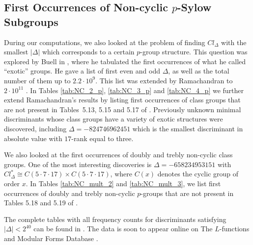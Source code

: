 \documentclass{mcom-l}
\theoremstyle{definition}
\begin{document}
\subsection{First Occurrences of Non-cyclic $p$-Sylow Subgroups}
During our computations, we also looked at the problem of finding
$Cl_\Delta$ with the smallest $|\Delta|$ which corresponds to a
certain $p$-group structure. This question was explored by Buell in
\cite{buell}, where he tabulated the first occurrences of what he
called ``exotic'' groups. He gave a list of first even and odd
$\Delta$, as well as the total number of them up to $2.2\cdot
10^9$. This list was extended by Ramachandran to $2\cdot 10^{11}$
\cite{ramachandran}. In Tables \ref{tab:NC_2_p}, \ref{tab:NC_3_p} and
\ref{tab:NC_4_p} we further extend Ramachandran's results by listing
first occurrences of class groups that are not present in Tables~5.13,
5.15 and 5.17 of \cite{ramachandran}.  Previously unknown minimal
discriminants whose class groups have a variety of exotic structures
were discovered, including $\Delta = -824746962451$ which is the
smallest discriminant in absolute value with $17$-rank equal to three.

We also looked at the first occurrences of doubly and trebly
non-cyclic class groups. One of the most interesting discoveries is
$\Delta = -658234953151$ with $Cl_\Delta^* \cong C(5\cdot 7\cdot 17)
\times C(5 \cdot 7 \cdot 17)$, where $C(x)$ denotes the cyclic group
of order $x$. In Tables \ref{tab:NC_mult_2} and \ref{tab:NC_mult_3},
we list first occurrences of doubly and trebly non-cyclic $p$-groups
that are not present in Tables 5.18 and 5.19 of \cite{ramachandran}.

The complete tables with all frequency counts for discriminants
satisfying \mbox{$|\Delta| < 2^{40}$} can be found in \cite{mosunov1}.
The data is soon to appear online on The $L$-functions and Modular
Forms Database \cite{lmfdb}.
\end{document}
